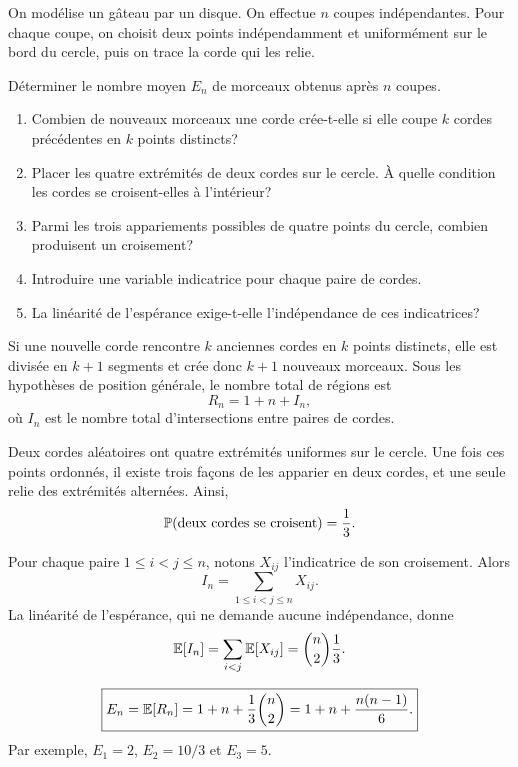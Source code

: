 \documentclass[11pt,a4paper]{article}
\begin{document}

\begin{statementbox}
On modélise un gâteau par un disque. On effectue $n$ coupes indépendantes.
Pour chaque coupe, on choisit deux points indépendamment et uniformément sur le
bord du cercle, puis on trace la corde qui les relie.


Déterminer le nombre moyen $E_n$ de morceaux obtenus après $n$ coupes.
\end{statementbox}

\begin{hintsbox}
\begin{enumerate}
  \item Combien de nouveaux morceaux une corde crée-t-elle si elle coupe $k$
  cordes précédentes en $k$ points distincts?
  \item Placer les quatre extrémités de deux cordes sur le cercle. À quelle
  condition les cordes se croisent-elles à l'intérieur?
  \item Parmi les trois appariements possibles de quatre points du cercle,
  combien produisent un croisement?
  \item Introduire une variable indicatrice pour chaque paire de cordes.
  \item La linéarité de l'espérance exige-t-elle l'indépendance de ces
  indicatrices?
\end{enumerate}
\end{hintsbox}

\correction

Si une nouvelle corde rencontre $k$ anciennes cordes en $k$ points distincts,
elle est divisée en $k+1$ segments et crée donc $k+1$ nouveaux morceaux.
Sous les hypothèses de position générale, le nombre total de régions est
\[
R_n=1+n+I_n,
\]
où $I_n$ est le nombre total d'intersections entre paires de cordes.

Deux cordes aléatoires ont quatre extrémités uniformes sur le cercle. Une fois
ces points ordonnés, il existe trois façons de les apparier en deux cordes, et
une seule relie des extrémités alternées. Ainsi,
\[
\mathbb P(\text{deux cordes se croisent})=\frac13.
\]

Pour chaque paire $1\leq i<j\leq n$, notons $X_{ij}$ l'indicatrice de son
croisement. Alors
\[
I_n=\sum_{1\leq i<j\leq n}X_{ij}.
\]
La linéarité de l'espérance, qui ne demande aucune indépendance, donne
\[
\mathbb E[I_n]
=\sum_{i<j}\mathbb E[X_{ij}]
=\binom n2\frac13.
\]

\begin{resultbox}
\[
\boxed{
E_n=\mathbb E[R_n]
=1+n+\frac13\binom n2
=1+n+\frac{n(n-1)}6.}
\]
Par exemple, $E_1=2$, $E_2=10/3$ et $E_3=5$.
\end{resultbox}
\end{document}
